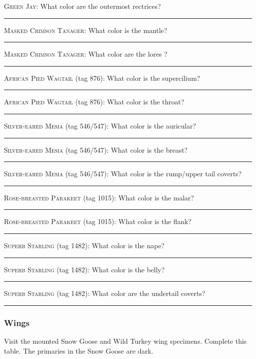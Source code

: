 \documentclass[10pt]{article}
\newcommand{\blankline}{\rule{2in}{0.4pt}}
\begin{document}
\textsc{Green Jay:} What color are the outermost rectrices? \blankline

\bigskip


\textsc{Masked Crimson Tanager:} What color is the mantle? \blankline

\bigskip

\textsc{Masked Crimson Tanager:} What color are the lores ? \blankline

\bigskip

 
\textsc{African Pied Wagtail} (tag 876): What color is the supercilium? \blankline

\bigskip

\textsc{African Pied Wagtail} (tag 876): What color is the throat? \blankline

\bigskip

\textsc{Silver-eared Mesia} (tag 546/547): What color is the auricular? \blankline

\bigskip

\textsc{Silver-eared Mesia} (tag 546/547): What color is the breast? \blankline

\bigskip

\textsc{Silver-eared Mesia} (tag 546/547): What color is the rump/upper tail coverts? \blankline

\bigskip


\textsc{Rose-breasted Parakeet} (tag 1015): What color is the malar? \blankline

\bigskip

\textsc{Rose-breasted Parakeet} (tag 1015): What color is the flank? \blankline

\bigskip

\textsc{Superb Starling} (tag 1482): What color is the nape? \blankline

\bigskip

\textsc{Superb Starling} (tag 1482): What color is the belly? \blankline

\bigskip
\textsc{Superb Starling} (tag 1482): What color are the undertail coverts?   \blankline

\subsubsection*{Wings}

Visit the mounted Snow Goose and Wild Turkey wing specimens. Complete this table. The primaries in the Snow Goose are dark. 
\end{document}
